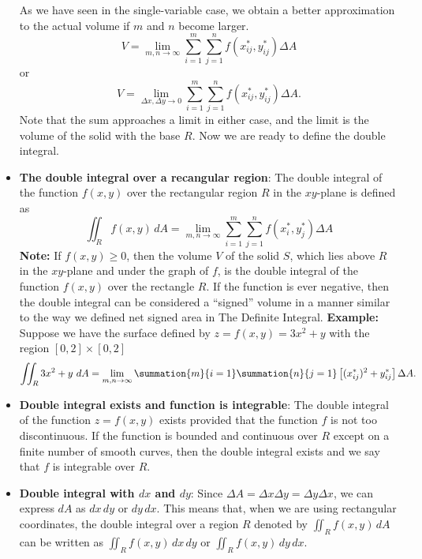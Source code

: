 \documentclass{report}
\begin{document}
\begin{itemize}
            \bigbreak \noindent 
            As we have seen in the single-variable case, we obtain a better approximation to the actual volume if $m$ and $n$ become larger.
            \[ V = \lim_{m,n \to \infty} \sum_{i=1}^{m}\sum_{j=1}^{n} f(x^*_{ij}, y^*_{ij})\Delta A \]
            or
            \[ V = \lim_{\Delta x, \Delta y \to 0} \sum_{i=1}^{m}\sum_{j=1}^{n} f(x^*_{ij}, y^*_{ij})\Delta A. \]
            Note that the sum approaches a limit in either case, and the limit is the volume of the solid with the base $R$. Now we are ready to define the double integral.

        \item \textbf{The double integral over a recangular region}:
            The double integral of the function $f(x,y)$ over the rectangular region $R$ in the $xy$-plane is defined as
            \begin{equation}
                \iint_{R} f(x,y) \, dA = \lim_{m,n \to \infty} \sum_{i=1}^{m}\sum_{j=1}^{n} f(x^*_{i}, y^*_{j})\Delta A 
            \end{equation}
            \bigbreak \noindent 
            \textbf{Note:} If $f(x,y) \geq 0$, then the volume $V$ of the solid $S$, which lies above $R$ in the $xy$-plane and under the graph of $f$, is the double integral of the function $f(x,y)$ over the rectangle $R$. If the function is ever negative, then the double integral can be considered a “signed” volume in a manner similar to the way we defined net signed area in The Definite Integral.
            \bigbreak \noindent 
            \textbf{Example:} Suppose we have the surface defined by $z=f(x,y) = 3x^{2} + y$ with the region $[0,2] \times [0,2]$
            \begin{align*}
                \iint_{R} 3x^{2} + y\ dA = \lim\limits_{m,n \to \infty}{\summation{m}{i=1}\summation{n}{j=1} \left[(x^{*}_{ij})^{2} + y^{*}_{ij}\right]\Delta A}
            .\end{align*}
        \item \textbf{Double integral exists and function is integrable}:
            The double integral of the function $z = f(x,y)$ exists provided that the function $f$ is not too discontinuous. If the function is bounded and continuous over $R$ except on a finite number of smooth curves, then the double integral exists and we say that $f$ is integrable over $R$.
        \item \textbf{Double integral with $dx$ and $dy$}: 
            Since $\Delta A = \Delta x \Delta y = \Delta y \Delta x$, we can express $dA$ as $dx\,dy$ or $dy\,dx$. This means that, when we are using rectangular coordinates, the double integral over a region $R$ denoted by $\iint_{R} f(x,y) \, dA$ can be written as $\iint_{R} f(x,y) \, dx\,dy$ or $\iint_{R} f(x,y) \, dy\,dx$.

\end{itemize}
\end{document}
